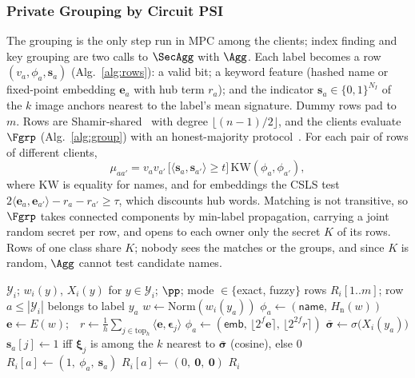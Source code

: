 \subsubsection{Private Grouping by Circuit PSI}
\label{sec:setup}
The grouping is the only step run in MPC among the clients; index finding and key grouping are two
calls to $\SecAgg$ with $\Agg$. Each label becomes a row $(v_a,\phi_a,\mathbf{s}_a)$
(Alg.~\ref{alg:rows}): a valid bit; a keyword feature (hashed name or
fixed-point embedding $\mathbf{e}_a$ with hub term $r_a$); and the indicator
$\mathbf{s}_a\in\{0,1\}^{N_I}$ of the $k$ image anchors nearest to the label's mean signature. Dummy
rows pad to $m$. Rows are Shamir-shared~\cite{shamir1979share} with degree $\lfloor(n-1)/2\rfloor$,
and the clients evaluate $\Fgrp$ (Alg.~\ref{alg:group}) with an honest-majority
protocol~\cite{damgard2007scalable}. For each pair of rows of different clients,
\begin{equation}
  \mu_{aa'}=v_a v_{a'}\,\big[\langle\mathbf{s}_a,\mathbf{s}_{a'}\rangle\ge t\big]\,
  \mathrm{KW}(\phi_a,\phi_{a'}),
  \label{eq:match}
\end{equation}
where $\mathrm{KW}$ is equality for names, and for embeddings the CSLS
test~\cite{conneau2018word} $2\langle\mathbf{e}_a,\mathbf{e}_{a'}\rangle-r_a-r_{a'}\ge\tau$, which
discounts hub words. Matching is not transitive, so $\Fgrp$ takes connected components by min-label
propagation, carrying a joint random secret per row, and opens to each owner only the secret $K$ of
its rows. Rows of one class share $K$; nobody sees the matches or the groups, and since $K$ is
random, $\Agg$ cannot test candidate names.

\begin{algorithm}[t]
\caption{$\mathsf{LocalRows}$, run by $C_i$ (no communication)}
\label{alg:rows}
\begin{algorithmic}[1]
\Require $\mathcal{Y}_i$; $w_i(y)$, $X_i(y)$ for $y\in\mathcal{Y}_i$; $\pp$; mode $\in\{$exact, fuzzy$\}$
\Ensure rows $R_i[1..m]$; row $a\le|\mathcal{Y}_i|$ belongs to label $y_a$
  \State $w\gets\mathrm{Norm}(w_i(y_a))$ 
    \State $\phi_a\gets(\textsf{name},\,H_{\mathrm{n}}(w))$
  \Else
    \State $\mathbf{e}\gets E(w)$;\ \ $r\gets\frac1h\sum_{j\in\mathrm{top}_h}\langle\mathbf{e},\boldsymbol{\epsilon}_j\rangle$
    \State $\phi_a\gets(\textsf{emb},\,\lfloor2^{f}\mathbf{e}\rceil,\,\lfloor2^{2f}r\rceil)$ 
  \EndIf
  \State $\bar{\boldsymbol\sigma}\gets\sigma\big(X_i(y_a)\big)$ 
  \State $\mathbf{s}_a[j]\gets1$ iff $\boldsymbol{\xi}_j$ is among the $k$ nearest to $\bar{\boldsymbol\sigma}$ (cosine), else $0$
  \State $R_i[a]\gets(1,\ \phi_a,\ \mathbf{s}_a)$
\EndFor
{}
  \State $R_i[a]\gets(0,\ \mathbf{0},\ \mathbf{0})$ 
\EndFor
\State \Return $R_i$
\end{algorithmic}
\end{algorithm}

